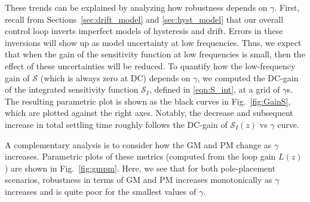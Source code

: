 \documentclass[twocolumn,twoside]{IEEEtran}
\begin{document}
These trends can be explained by analyzing how robustness depends on $\gamma$. First, recall from Sections~\ref{sec:drift_model} and \ref{sec:hyst_model} that our overall control loop inverts imperfect models of hysteresis and drift. Errors in these inversions will show up as model uncertainty at low frequencies. Thus, we expect that when the gain of the sensitivity function at low frequencies is small, then the effect of these uncertainties will be reduced. To quantify how the low-frequency gain of $\mathcal{S}$ (which is always zero at DC) depends on $\gamma$, we computed the DC-gain of the integrated sensitivity function $\mathcal{S}_I$, defined in \eqref{eqn:S_int}, at a grid of $\gamma$s. The resulting parametric plot is shown as the black curves in Fig.~\ref{fig:GainS}, which are plotted against the right axes. Notably, the decrease and subsequent increase in total settling time roughly follows the DC-gain of $\mathcal{S}_I(z)$ vs $\gamma$ curve.

A complementary analysis is to consider how the GM and PM change as $\gamma$ increases. Parametric plots of these metrics (computed from the loop gain $L(z)$) are shown in Fig.~\ref{fig:gmpm}. 
Here, we see that for both pole-placement scenarios, robustness in terms of GM and PM increases monotonically as $\gamma$ increases and is quite poor for the smallest values of $\gamma$.
\end{document}
